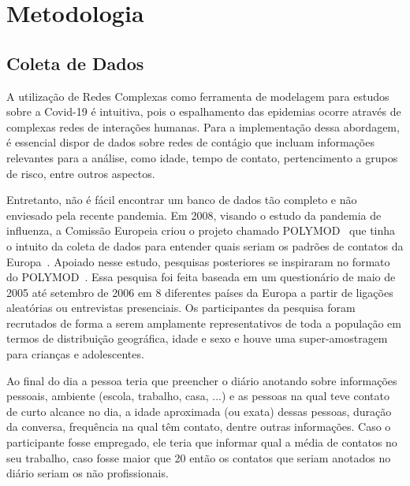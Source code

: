 \chapter{Metodologia}

\section{Coleta de Dados}

A utilização de Redes Complexas como ferramenta de modelagem para estudos sobre a Covid-19 é intuitiva, pois o espalhamento das epidemias ocorre através de complexas redes de interações humanas. Para a implementação dessa abordagem, é essencial dispor de dados sobre redes de contágio que incluam informações relevantes para a análise, como idade, tempo de contato, pertencimento a grupos de risco, entre outros aspectos.

Entretanto, não é fácil encontrar um banco de dados tão completo e não enviesado pela recente pandemia. Em 2008, visando o estudo da pandemia de influenza, a Comissão Europeia criou o projeto chamado POLYMOD~\cite{POLYMOD} que tinha o intuito da coleta de dados para entender quais seriam os padrões de contatos da Europa~\cite{Mossong2008}. Apoiado nesse estudo, pesquisas posteriores se inspiraram no formato do POLYMOD~\cite{Belga2009,Belga2010,China,France,HongKong,Peru,Russia,Thailand,Vietnam,Zambia,Zimbabwe}. Essa pesquisa foi feita baseada em um questionário de maio de 2005 até setembro de 2006 em 8 diferentes países da Europa a partir de ligações aleatórias ou entrevistas presenciais. Os participantes da pesquisa foram recrutados de forma a serem amplamente representativos de toda a população em termos de distribuição geográfica, idade e sexo e houve uma super-amostragem para crianças e adolescentes.

 Ao final do dia a pessoa teria que preencher o diário anotando sobre informações pessoais, ambiente (escola, trabalho, casa, ...) e as pessoas na qual teve contato de curto alcance no dia, a idade aproximada (ou exata) dessas pessoas, duração da conversa, frequência na qual têm contato, dentre outras informações. Caso o participante fosse empregado, ele teria que informar qual a média de contatos no seu trabalho, caso fosse maior que 20 então os contatos que seriam anotados no diário seriam os não profissionais. 

